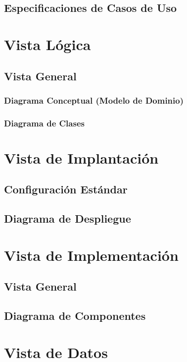 \documentclass{article}
\begin{document}
    \subsection{Especificaciones de Casos de Uso}

    \section{Vista Lógica} \label{vistaLogica}
    \subsection{Vista General}
    \subsubsection{Diagrama Conceptual (Modelo de Dominio)}
    \subsubsection{Diagrama de Clases}

    \section{Vista de Implantación} \label{vistaImplantacion}
    \subsection{Configuración Estándar}
    \subsection{Diagrama de Despliegue}


    \section{Vista de Implementación} \label{vistaImplementacion}
    \subsection{Vista General}
    \subsection{Diagrama de Componentes}


    \section{Vista de Datos} \label{vistaDatos}
\end{document}
